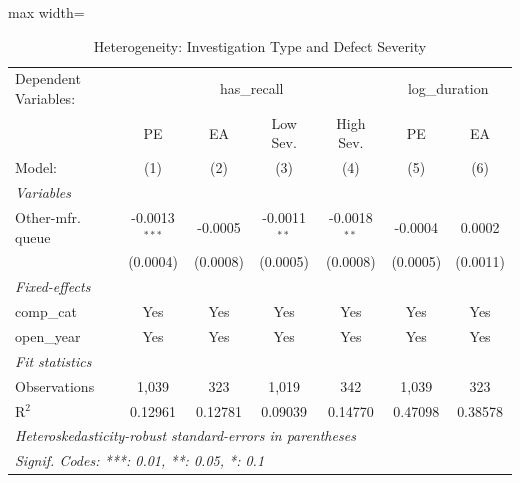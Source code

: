 \begin{table}[htbp]
   \caption{\label{tab:heterogeneity} Heterogeneity: Investigation Type and Defect Severity}
   \centering
   \begin{adjustbox}{max width=\textwidth}
   \begin{tabular}{lcccccc}
      \tabularnewline \midrule \midrule
      Dependent Variables: & \multicolumn{4}{c}{has\_recall} & \multicolumn{2}{c}{log\_duration}\\
                       & PE              & EA       & Low Sev.       & High Sev.      & PE       & EA \\   
      Model:           & (1)             & (2)      & (3)            & (4)            & (5)      & (6)\\  
      \midrule
      \emph{Variables}\\
      Other-mfr. queue & -0.0013$^{***}$ & -0.0005  & -0.0011$^{**}$ & -0.0018$^{**}$ & -0.0004  & 0.0002\\   
                       & (0.0004)        & (0.0008) & (0.0005)       & (0.0008)       & (0.0005) & (0.0011)\\   
      \midrule
      \emph{Fixed-effects}\\
      comp\_cat        & Yes             & Yes      & Yes            & Yes            & Yes      & Yes\\  
      open\_year       & Yes             & Yes      & Yes            & Yes            & Yes      & Yes\\  
      \midrule
      \emph{Fit statistics}\\
      Observations     & 1,039           & 323      & 1,019          & 342            & 1,039    & 323\\  
      R$^2$            & 0.12961         & 0.12781  & 0.09039        & 0.14770        & 0.47098  & 0.38578\\  
      \midrule \midrule
      \multicolumn{7}{l}{\emph{Heteroskedasticity-robust standard-errors in parentheses}}\\
      \multicolumn{7}{l}{\emph{Signif. Codes: ***: 0.01, **: 0.05, *: 0.1}}\\
   \end{tabular}
   \end{adjustbox}
\end{table}
